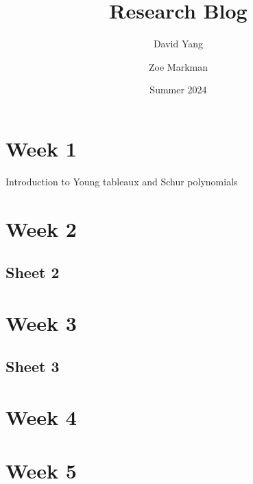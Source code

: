 \documentclass[11pt]{article}
\begin{document}
\title{\textbf{Research Blog}}
\author{David Yang \and Zoe Markman}
\date{Summer 2024}

\maketitle

\section{Week 1}
Introduction to Young tableaux and Schur polynomials

\section{Week 2}


\subsection{Sheet 2}


\newpage

\section{Week 3}


\subsection{Sheet 3}


\newpage

\section{Week 4}


\newpage

\section{Week 5}

\end{document}
